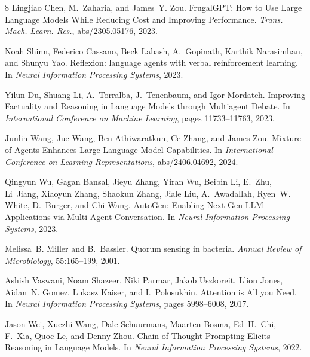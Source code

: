 \documentclass[11pt,letterpaper]{article}
\begin{document}
\begin{thebibliography}{8}
Lingjiao Chen, M.~Zaharia, and James~Y. Zou.
\newblock FrugalGPT: How to Use Large Language Models While Reducing Cost and Improving Performance.
\newblock \emph{Trans. Mach. Learn. Res.}, abs/2305.05176, 2023.

Noah Shinn, Federico Cassano, Beck Labash, A.~Gopinath, Karthik Narasimhan, and Shunyu Yao.
\newblock Reflexion: language agents with verbal reinforcement learning.
\newblock In \emph{Neural Information Processing Systems}, 2023.

Yilun Du, Shuang Li, A.~Torralba, J.~Tenenbaum, and Igor Mordatch.
\newblock Improving Factuality and Reasoning in Language Models through Multiagent Debate.
\newblock In \emph{International Conference on Machine Learning}, pages 11733--11763, 2023.

Junlin Wang, Jue Wang, Ben Athiwaratkun, Ce Zhang, and James Zou.
\newblock Mixture-of-Agents Enhances Large Language Model Capabilities.
\newblock In \emph{International Conference on Learning Representations}, abs/2406.04692, 2024.

Qingyun Wu, Gagan Bansal, Jieyu Zhang, Yiran Wu, Beibin Li, E.~Zhu, Li~Jiang, Xiaoyun Zhang, Shaokun Zhang, Jiale Liu, A.~Awadallah, Ryen~W. White, D.~Burger, and Chi Wang.
\newblock AutoGen: Enabling Next-Gen LLM Applications via Multi-Agent Conversation.
\newblock In \emph{Neural Information Processing Systems}, 2023.

Melissa~B. Miller and B.~Bassler.
\newblock Quorum sensing in bacteria.
\newblock \emph{Annual Review of Microbiology}, 55:165--199, 2001.

Ashish Vaswani, Noam Shazeer, Niki Parmar, Jakob Uszkoreit, Llion Jones, Aidan~N. Gomez, Lukasz Kaiser, and I.~Polosukhin.
\newblock Attention is All you Need.
\newblock In \emph{Neural Information Processing Systems}, pages 5998--6008, 2017.

Jason Wei, Xuezhi Wang, Dale Schuurmans, Maarten Bosma, Ed~H.~Chi, F.~Xia, Quoc Le, and Denny Zhou.
\newblock Chain of Thought Prompting Elicits Reasoning in Language Models.
\newblock In \emph{Neural Information Processing Systems}, 2022.
\end{thebibliography}
\end{document}
